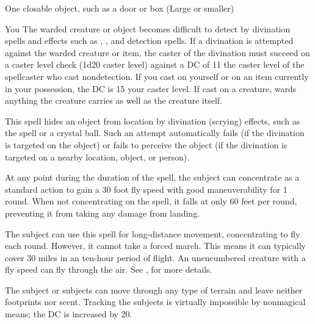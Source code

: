 \begin{spelltarget}{One closable object, such as a door or box (Large or smaller)}
\begin{spelltarget}{You}
\spelldur{\durext \dismissable}
\spelleffect The warded creature or object becomes difficult to detect by divination spells and effects such as , , and detection spells. If a divination is attempted against the warded creature or item, the caster of the divination must succeed on a caster level check (1d20 \add caster level) against a DC of 11 \add the caster level of the spellcaster who cast nondetection. If you cast  on yourself or on an item currently in your possession, the DC is 15 \add your caster level.
\spellnotes If cast on a creature,  wards anything the creature carries as well as the creature itself.

\spelldur{\durext \dismissable}
\spelleffect This spell hides an object from location by divination (scrying) effects, such as the  spell or a crystal ball. Such an attempt automatically fails (if the divination is targeted on the object) or fails to perceive the object (if the divination is targeted on a nearby location, object, or person).

\spelldur{\durext}
\spelleffect At any point during the duration of the spell, the subject can concentrate as a standard action to gain a 30 foot fly speed with good maneuverability for 1 round. When not concentrating on the spell, it falls at only 60 feet per round, preventing it from taking any damage from landing.

The subject can use this spell for long-distance movement, concentrating to fly each round. However, it cannot take a forced march. This means it can typically cover 30 miles in an ten-hour period of flight.
\spellnotes An unencumbered creature with a fly speed can fly through the air. See , for more details.

\spelldur{\durext \dismissable}
\spelleffect The subject or subjects can move through any type of terrain and leave neither footprints nor scent. Tracking the subjects is virtually impossible by nonmagical means; the DC is increased by 20.


\end{spelltarget}
\end{spelltarget}
